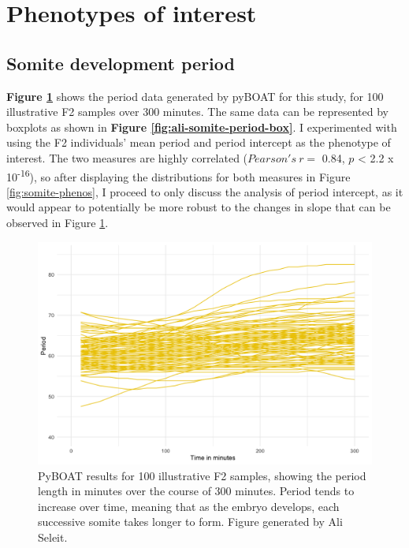 \documentclass[
]{book}
\begin{document}
\clearpage

\hypertarget{somite-phenotype}{%
\section{Phenotypes of interest}\label{somite-phenotype}}

\hypertarget{somite-development-period}{%
\subsection{Somite development period}\label{somite-development-period}}

\textbf{Figure \ref{fig:ali-somite-period-lines}} shows the period data generated by pyBOAT for this study, for 100 illustrative F2 samples over 300 minutes. The same data can be represented by boxplots as shown in \textbf{Figure \ref{fig:ali-somite-period-box}}. I experimented with using the F2 individuals' mean period and period intercept as the phenotype of interest. The two measures are highly correlated (\(Pearson's~r =\) 0.84, \(p\) \textless{} 2.2 x 10\textsuperscript{-16}), so after displaying the distributions for both measures in Figure \ref{fig:somite-phenos}, I proceed to only discuss the analysis of period intercept, as it would appear to potentially be more robust to the changes in slope that can be observed in Figure \ref{fig:ali-somite-period-lines}.



\begin{figure}
\includegraphics[width=1\linewidth]{figs/somites/ali_period_lines_100fish300mins} \caption{PyBOAT results for 100 illustrative F2 samples, showing the period length in minutes over the course of 300 minutes. Period tends to increase over time, meaning that as the embryo develops, each successive somite takes longer to form. Figure generated by Ali Seleit.}\label{fig:ali-somite-period-lines}
\end{figure}
\end{document}
